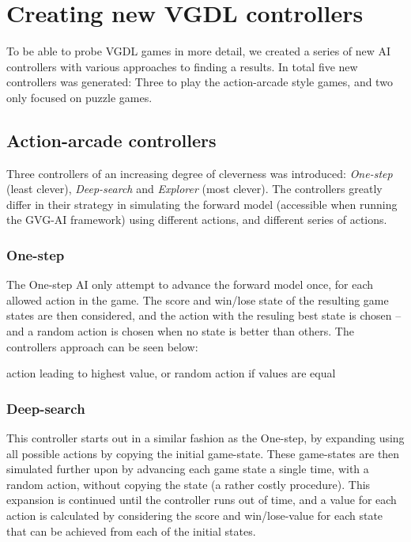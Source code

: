 \documentclass[a4paper,titlepage,final]{report}
\begin{document}
\section{Creating new VGDL controllers}
To be able to probe VGDL games in more detail, we created a series of new AI controllers with various approaches to finding a results.
In total five new controllers was generated: Three to play the action-arcade style games, and two only focused on puzzle games.

\subsection{Action-arcade controllers}
\label{ssec_actioncontrollers}

Three controllers of an increasing degree of cleverness was introduced: \textit{One-step} (least clever), \textit{Deep-search} and \textit{Explorer} (most clever). 
The controllers greatly differ in their strategy in simulating the forward model (accessible when running the GVG-AI framework) using different actions, and different series of actions.

\subsubsection*{One-step}
The One-step AI only attempt to advance the forward model once, for each allowed action in the game.
The score and win/lose state of the resulting game states are then considered, and the action with the resuling best state is chosen -- and a random action is chosen when no state is better than others.
The controllers approach can be seen below:

\begin{algorithm}[H]
\Return action leading to highest value, or random action if values are equal
\end{algorithm}

\subsubsection*{Deep-search}
This controller starts out in a similar fashion as the One-step, by expanding using all possible actions by copying the initial game-state.
These game-states are then simulated further upon by advancing each game state a single time, with a random action, without copying the state (a rather costly procedure).
This expansion is continued until the controller runs out of time, and a value for each action is calculated by considering the score and win/lose-value for each state that can be achieved from each of the initial states.
\end{document}
